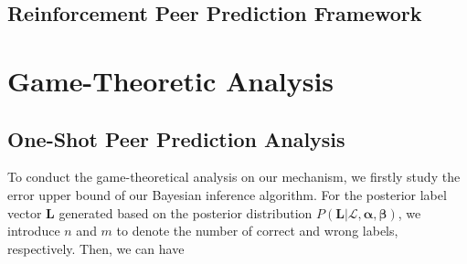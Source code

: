 \documentclass{article}
\begin{document}
\subsection{Reinforcement Peer Prediction Framework}

\section{Game-Theoretic Analysis}
\subsection{One-Shot Peer Prediction Analysis}
To conduct the game-theoretical analysis on our mechanism, we firstly study the error upper bound of our Bayesian inference algorithm.
For the posterior label vector $\bm{L}$ generated based on the posterior distribution $P(\bm{L}|\mathcal{L},\bm{\alpha}, \bm{\beta})$, we introduce $n$ and $m$ to denote the number of correct and wrong labels, respectively. Then, we can have
\end{document}
